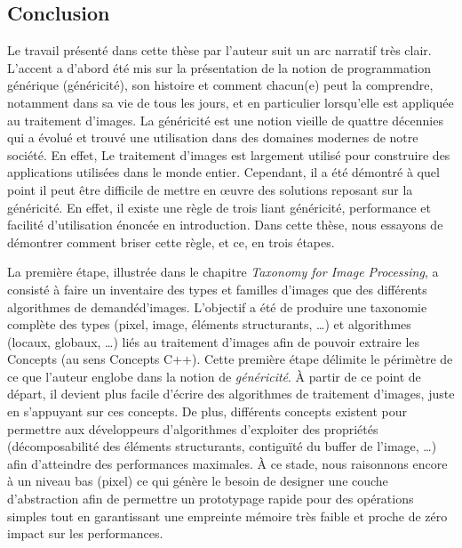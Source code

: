 \subsection*{Conclusion}


Le travail présenté dans cette thèse par l'auteur suit un arc narratif très clair. L'accent a d'abord été mis sur la
présentation de la notion de programmation générique (généricité), son histoire et comment chacun(e) peut la comprendre,
notamment dans sa vie de tous les jours, et en particulier lorsqu'elle est appliquée au traitement d'images. La
généricité est une notion vieille de quattre décennies qui a évolué et trouvé une utilisation dans des domaines modernes
de notre société. En effet, Le traitement d'images est largement utilisé pour construire des applications utilisées dans
le monde entier. Cependant, il a été démontré à quel point il peut être difficile de mettre en \oe{}uvre des solutions
reposant sur la généricité. En effet, il existe une règle de trois liant généricité, performance et facilité
d'utilisation énoncée en introduction. Dans cette thèse, nous essayons de démontrer comment briser cette règle, et ce,
en trois étapes.

La première étape, illustrée dans le chapitre \emph{Taxonomy for Image Processing}, a consisté à faire un inventaire des
types et familles d'images que des différents algorithmes de demandéd'images. L'objectif a été de produire une
taxonomie complète des types (pixel, image, éléments structurants, \ldots) et algorithmes (locaux, globaux, \ldots) liés
au traitement d'images afin de pouvoir extraire les Concepts (au sens Concepts C++). Cette première étape délimite le
périmètre de ce que l'auteur englobe dans la notion de \emph{généricité}. \`{A} partir de ce point de départ, il devient
plus facile d'écrire des algorithmes de traitement d'images, juste en s'appuyant sur ces concepts. De plus, différents
concepts existent pour permettre aux développeurs d'algorithmes d'exploiter des propriétés (décomposabilité des éléments
structurants, contiguïté du buffer de l'image, \ldots) afin d'atteindre des performances maximales. \`{A} ce stade, nous
raisonnons encore à un niveau bas (pixel) ce qui génère le besoin de designer une couche d'abstraction afin de permettre
un prototypage rapide pour des opérations simples tout en garantissant une empreinte mémoire très faible et proche de
zéro impact sur les performances.

